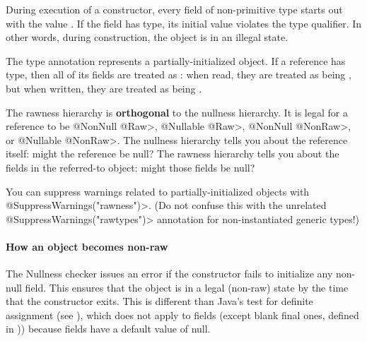 During execution of a constructor, every field of non-primitive type starts
out with the value .  If the field has
 type, its initial value 
violates the  type qualifier.  In other words, during
construction, the object is in an illegal state.


The  type annotation represents a
partially-initialized object.  If a reference has
 type, then all of its  fields are treated as
:  when read, they are
treated as being , but when
written, they are treated as being
.


The rawness hierarchy is \textbf{orthogonal} to the nullness hierarchy.  It
is legal for a reference to be \<@NonNull @Raw>, \<@Nullable @Raw>,
\<@NonNull @NonRaw>, or \<@Nullable @NonRaw>.  The nullness hierarchy tells
you about the reference itself:  might the reference be null?
The rawness hierarchy tells you about the fields in the referred-to object:
might those fields be null?




You can suppress warnings related to partially-initialized objects with
\<@SuppressWarnings("rawness")>.  (Do not confuse this with the unrelated
\<@SuppressWarnings("rawtypes")> annotation for non-instantiated generic types!)


\paragraph{How an object becomes non-raw}

The Nullness checker issues an error if the constructor fails to initialize
any non-null field.  This ensures that the object is in a legal (non-raw)
state by the time that the constructor exits.
This is different than Java's test for definite assignment (see 
),
which does not apply to fields (except blank final ones, defined in
)) because fields
have a default value of null.


